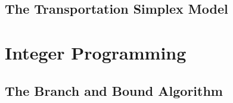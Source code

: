 \subsection{The Transportation Simplex Model}\label{sec:trans-simplex}

\section{Integer Programming}

\subsection{The Branch and Bound Algorithm}\label{sec:bnb}
